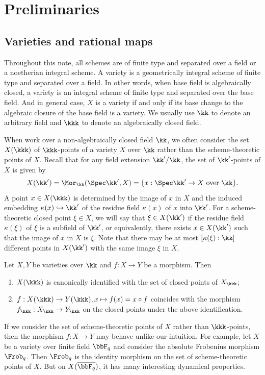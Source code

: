 \section{Preliminaries}


\subsection{Varieties and rational maps}

  Throughout this note, all schemes are of finite type and separated over a field or a noetherian integral scheme.
  A variety is a geometrically integral scheme of finite type and separated over a field.
  In other words, when base field is algebraically closed, a variety is an integral scheme of finite type and separated over the base field.
  And in general case, $X$ is a variety if and only if its base change to the algebraic closure of the base field is a variety.
  We usually use $\kk$ to denote an arbitrary field and $\kkk$ to denote an algebraically closed field.

  When work over a non-algebraically closed field $\kk$, we often consider the set $X(\kkk)$ of $\kkk$-points of a variety $X$ over $\kk$ rather than the scheme-theoretic points of $X$.
  Recall that for any field extension $\kk'/\kk$, the set of $\kk'$-points of $X$ is given by
  \[ X(\kk') = \Mor_{\kk}(\Spec \kk', X) = \{ x: \Spec \kk' \to X \text{ over } \kk \}. \]
  A point $x \in X(\kkk)$ is determined by the image of $x$ in $X$ and the induced embedding $\kappa(x) \hookrightarrow \kk'$ of the residue field $\kappa(x)$ of $x$ into $\kk'$.
  For a scheme-theoretic closed point $\xi \in X$, we will say that $\xi \in X(\kk')$ if the residue field $\kappa(\xi)$ of $\xi$ is a subfield of $\kk'$, or equivalently, there exists $x \in X(\kk')$ such that the image of $x$ in $X$ is $\xi$.
  Note that there may be at most $[\kappa(\xi):\kk]$ different points in $X(\kk')$ with the same image $\xi$ in $X$.
  \begin{proposition}\label{prop:closed_points_on_varieties_over_non-algebraically_closed_fields}
    Let $X,Y$ be varieties over $\kk$ and $f: X \to Y$ be a morphism.
    Then 
    \begin{enumerate}
      \item $X(\kkk)$ is canonically identified with the set of closed points of $X_\kkk$;
      \item $f: X(\kkk) \to Y(\kkk), x \mapsto f(x) = x \circ f$ coincides with the morphism $f_\kkk: X_\kkk \to Y_\kkk$ on the closed points under the above identification.
    \end{enumerate}
  \end{proposition}
  \begin{remark}
    If we consider the set of scheme-theoretic points of $X$ rather than $\kkk$-points, then the morphism $f: X \to Y$ may behave unlike our intuition.
    For example, let $X$ be a variety over finite field $\bbF_q$ and consider the absolute Frobenius morphism $\Frob_q$.
    Then $\Frob_q$ is the identity morphism on the set of scheme-theoretic points of $X$.
    But on $X(\overline{\bbF_q})$, it has many interesting dynamical properties.
  \end{remark}

